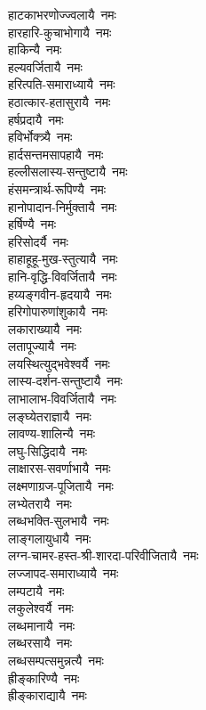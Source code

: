 \begin{multicols}{2}
\begin{flushleft}
हाटकाभरणोज्ज्वलायै~नमः\\
हारहारि-कुचाभोगायै~नमः\\
हाकिन्यै~नमः\\
हल्यवर्जितायै~नमः\\
हरित्पति-समाराध्यायै~नमः\\
हठात्कार-हतासुरायै~नमः\\
हर्षप्रदायै~नमः\\
हविर्भोक्त्र्यै~नमः\hfill {}\\
हार्दसन्तमसापहायै~नमः\\
हल्लीसलास्य-सन्तुष्टायै~नमः\\
हंसमन्त्रार्थ-रूपिण्यै~नमः\\
हानोपादान-निर्मुक्तायै~नमः\\
हर्षिण्यै~नमः\\
हरिसोदर्यै~नमः\\
हाहाहूहू-मुख-स्तुत्यायै~नमः\\
हानि-वृद्धि-विवर्जितायै~नमः\\
हय्यङ्गवीन-हृदयायै~नमः\\
हरिगोपारुणांशुकायै~नमः\hfill {}\\
लकाराख्यायै~नमः\\
लतापूज्यायै~नमः\\
लयस्थित्युद्भवेश्वर्यै~नमः\\
लास्य-दर्शन-सन्तुष्टायै~नमः\\
लाभालाभ-विवर्जितायै~नमः\\
लङ्घ्येतराज्ञायै~नमः\\
लावण्य-शालिन्यै~नमः\\
लघु-सिद्धिदायै~नमः\\
लाक्षारस-सवर्णाभायै~नमः\\
लक्ष्मणाग्रज-पूजितायै~नमः\hfill {}\\
लभ्येतरायै~नमः\\
लब्धभक्ति-सुलभायै~नमः\\
लाङ्गलायुधायै~नमः\\
लग्न-चामर-हस्त-श्री-शारदा-परिवीजितायै~नमः\\
लज्जापद-समाराध्यायै~नमः\\
लम्पटायै~नमः\\
लकुलेश्वर्यै~नमः\\
लब्धमानायै~नमः\\
लब्धरसायै~नमः\\
लब्धसम्पत्समुन्नत्यै~नमः\hfill {}\\
ह्रीङ्कारिण्यै~नमः\\
ह्रीङ्काराद्यायै~नमः\\

\end{flushleft}
\end{multicols}
